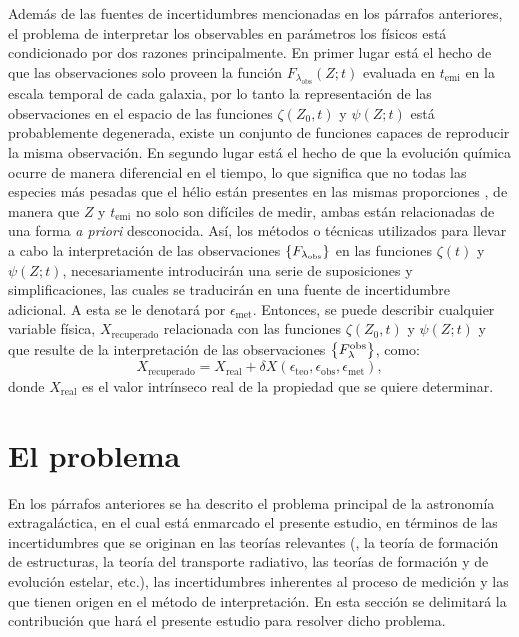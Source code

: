 Además de las fuentes de incertidumbres mencionadas en los párrafos anteriores, el problema de
interpretar los observables en parámetros los físicos está condicionado por dos razones
principalmente. En primer lugar está el hecho de que las observaciones solo proveen la función
$F_{\lambda_\text{obs}}(Z;t)$ evaluada en $t_\text{emi}$ en la escala temporal de cada galaxia, por
lo tanto la representación de las observaciones en el espacio de las funciones $\zeta(Z_0,t)$ y
$\psi(Z;t)$ está probablemente degenerada, \ie existe un conjunto de funciones capaces de reproducir
la misma observación. En segundo lugar está el hecho de que la evolución química ocurre de manera
diferencial en el tiempo, lo que significa que no todas las especies más pesadas que el hélio están
presentes en las mismas proporciones \citep[\eg,][]{Yates2013}, de manera que $Z$ y $t_\text{emi}$
no solo son difíciles de medir, ambas están relacionadas de una forma \emph{a priori} desconocida.
Así, los métodos o técnicas utilizados para llevar a cabo la interpretación de las observaciones
$\set{F_{\lambda_\text{obs}}}$ en las funciones $\zeta(t)$ y $\psi(Z;t)$, necesariamente
introducirán una serie de suposiciones y simplificaciones, las cuales se traducirán en una fuente de
incertidumbre adicional. A esta se le denotará por $\epsilon_\text{met}$. Entonces, se puede
describir cualquier variable física, $X_\text{recuperado}$ relacionada con las funciones
$\zeta(Z_0,t)$ y $\psi(Z;t)$ y que resulte de la interpretación de las observaciones
$\set{\sedt[F]{obs}}$, como:
%
\begin{equation}\label{ec:uncertainties}
X_\text{recuperado} = X_\text{real} + \delta{X}(\epsilon_\text{teo},\epsilon_\text{obs},\epsilon_\text{met}),
\end{equation}
%
donde $X_\text{real}$ es el valor intrínseco real de la propiedad que se quiere determinar.

\section{El problema}

En los párrafos anteriores se ha descrito el problema principal de la astronomía extragaláctica, en
el cual está enmarcado el presente estudio, en términos de las incertidumbres que se originan en las
teorías relevantes (\eg, la teoría de formación de estructuras, la teoría del transporte radiativo,
las teorías de formación y de evolución estelar, etc.), las incertidumbres inherentes al proceso de
medición y las que tienen origen en el método de interpretación. En esta sección se delimitará la
contribución que hará el presente estudio para resolver dicho problema.

